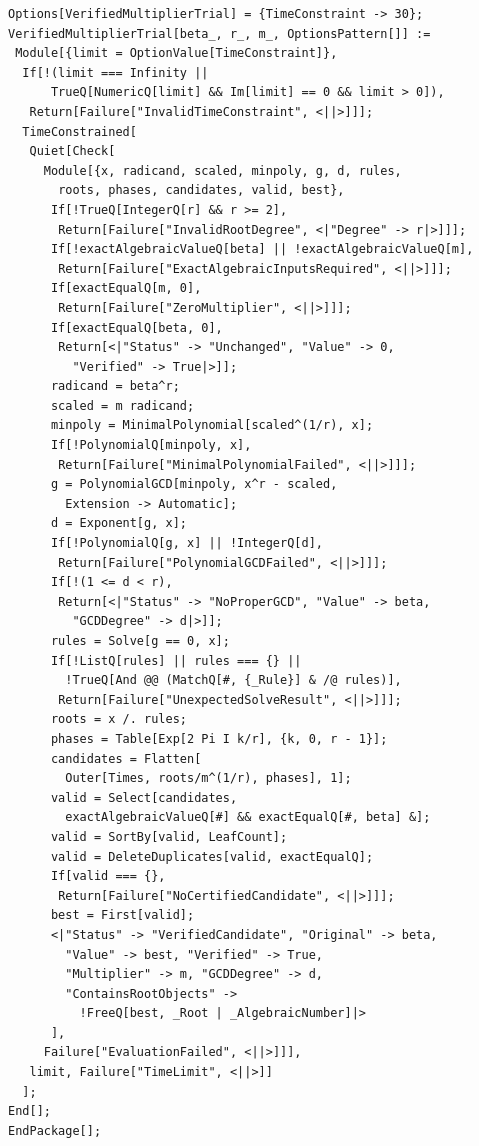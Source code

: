 \documentclass[11pt,letterpaper]{article}
\theoremstyle{definition}
\theoremstyle{remark}
\begin{document}
\begin{lstlisting}
Options[VerifiedMultiplierTrial] = {TimeConstraint -> 30};
VerifiedMultiplierTrial[beta_, r_, m_, OptionsPattern[]] :=
 Module[{limit = OptionValue[TimeConstraint]},
  If[!(limit === Infinity ||
      TrueQ[NumericQ[limit] && Im[limit] == 0 && limit > 0]),
   Return[Failure["InvalidTimeConstraint", <||>]]];
  TimeConstrained[
   Quiet[Check[
     Module[{x, radicand, scaled, minpoly, g, d, rules,
       roots, phases, candidates, valid, best},
      If[!TrueQ[IntegerQ[r] && r >= 2],
       Return[Failure["InvalidRootDegree", <|"Degree" -> r|>]]];
      If[!exactAlgebraicValueQ[beta] || !exactAlgebraicValueQ[m],
       Return[Failure["ExactAlgebraicInputsRequired", <||>]]];
      If[exactEqualQ[m, 0],
       Return[Failure["ZeroMultiplier", <||>]]];
      If[exactEqualQ[beta, 0],
       Return[<|"Status" -> "Unchanged", "Value" -> 0,
         "Verified" -> True|>]];
      radicand = beta^r;
      scaled = m radicand;
      minpoly = MinimalPolynomial[scaled^(1/r), x];
      If[!PolynomialQ[minpoly, x],
       Return[Failure["MinimalPolynomialFailed", <||>]]];
      g = PolynomialGCD[minpoly, x^r - scaled,
        Extension -> Automatic];
      d = Exponent[g, x];
      If[!PolynomialQ[g, x] || !IntegerQ[d],
       Return[Failure["PolynomialGCDFailed", <||>]]];
      If[!(1 <= d < r),
       Return[<|"Status" -> "NoProperGCD", "Value" -> beta,
         "GCDDegree" -> d|>]];
      rules = Solve[g == 0, x];
      If[!ListQ[rules] || rules === {} ||
        !TrueQ[And @@ (MatchQ[#, {_Rule}] & /@ rules)],
       Return[Failure["UnexpectedSolveResult", <||>]]];
      roots = x /. rules;
      phases = Table[Exp[2 Pi I k/r], {k, 0, r - 1}];
      candidates = Flatten[
        Outer[Times, roots/m^(1/r), phases], 1];
      valid = Select[candidates,
        exactAlgebraicValueQ[#] && exactEqualQ[#, beta] &];
      valid = SortBy[valid, LeafCount];
      valid = DeleteDuplicates[valid, exactEqualQ];
      If[valid === {},
       Return[Failure["NoCertifiedCandidate", <||>]]];
      best = First[valid];
      <|"Status" -> "VerifiedCandidate", "Original" -> beta,
        "Value" -> best, "Verified" -> True,
        "Multiplier" -> m, "GCDDegree" -> d,
        "ContainsRootObjects" ->
          !FreeQ[best, _Root | _AlgebraicNumber]|>
      ],
     Failure["EvaluationFailed", <||>]]],
   limit, Failure["TimeLimit", <||>]]
  ];
End[];
EndPackage[];
\end{lstlisting}

\clearpage
\end{document}
